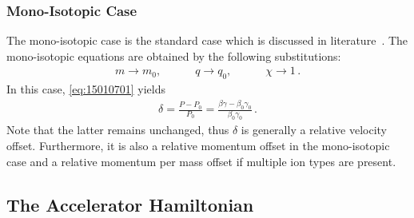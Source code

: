 \subsubsection{Mono-Isotopic Case}
The mono-isotopic case is the standard case which is discussed in literature~\cite{}. The mono-isotopic equations are obtained by the following substitutions:
\begin{align}
m \rightarrow m_0, \quad \quad \quad q \rightarrow q_0, \quad \quad \quad  \chi \rightarrow 1\, .
\end{align}
In this case, \eqref{eq:15010701} yields
\begin{align}
\delta = \frac{P - P_0}{P_0} = \frac{\beta \gamma - \beta_0 \gamma_0}{\beta_0 \gamma_0} \, .
\end{align}
Note that the latter remains unchanged, thus $\delta$ is generally a relative velocity offset. Furthermore, it is also a relative momentum offset in the mono-isotopic case and a relative momentum per mass offset if multiple ion types are present.



\subsection{The Accelerator Hamiltonian} \label{chap:accelerator_hamiltonian}

